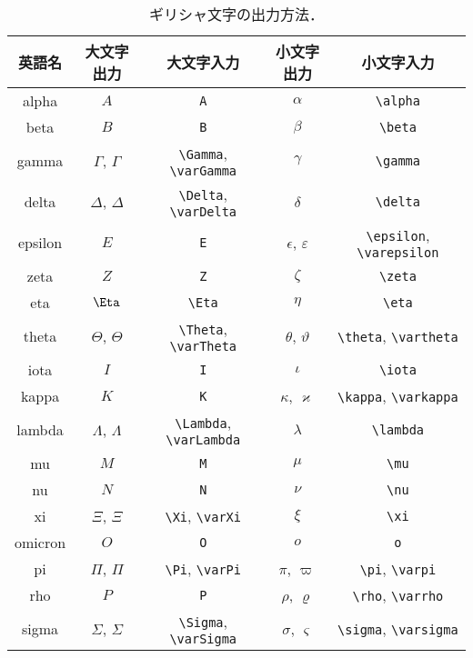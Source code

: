 \begin{table}[tp]
    \centering
    \caption{ギリシャ文字の出力方法．}
    \label{table:greek}
    \begin{tabular}{c|c|c|c|c} \hline\hline
        英語名 & 大文字出力 & 大文字入力 & 小文字出力 & 小文字入力 \\ \hline
        alpha & $A$ & \verb|A| & $\alpha$ & \verb|\alpha| \\ \hline
        beta & $B$ & \verb|B| & $\beta$ & \verb|\beta| \\ \hline
        gamma & $\Gamma$, $\varGamma$ & \verb|\Gamma|, \verb|\varGamma| & $\gamma$ & \verb|\gamma| \\ \hline
        delta & $\Delta$, $\varDelta$ & \verb|\Delta|, \verb|\varDelta| & $\delta$ & \verb|\delta| \\ \hline
        epsilon & $E$ & \verb|E| & $\epsilon$, $\varepsilon$ & \verb|\epsilon|, \verb|\varepsilon| \\ \hline
        zeta & $Z$ & \verb|Z| & $\zeta$ & \verb|\zeta| \\ \hline
        eta & $\Eta$ & \verb|\Eta| & $\eta$ & \verb|\eta| \\ \hline
        theta & $\Theta$, $\varTheta$ & \verb|\Theta|, \verb|\varTheta| & $\theta$, $\vartheta$ & \verb|\theta|, \verb|\vartheta| \\ \hline
        iota & $I$ & \verb|I| & $\iota$ & \verb|\iota| \\ \hline
        kappa & $K$ & \verb|K| & $\kappa$, $\varkappa$ & \verb|\kappa|, \verb|\varkappa| \\ \hline
        lambda & $\Lambda$, $\varLambda$ & \verb|\Lambda|, \verb|\varLambda| & $\lambda$ & \verb|\lambda| \\ \hline
        mu & $M$ & \verb|M| & $\mu$ & \verb|\mu| \\ \hline
        nu & $N$ & \verb|N| & $\nu$ & \verb|\nu| \\ \hline
        xi & $\Xi$, $\varXi$ & \verb|\Xi|, \verb|\varXi| & $\xi$ & \verb|\xi| \\ \hline
        omicron & $O$ & \verb|O| & $o$ & \verb|o| \\ \hline
        pi & $\Pi$, $\varPi$ & \verb|\Pi|, \verb|\varPi| & $\pi$, $\varpi$ & \verb|\pi|, \verb|\varpi| \\ \hline
        rho & $P$ & \verb|P| & $\rho$, $\varrho$ & \verb|\rho|, \verb|\varrho| \\ \hline
        sigma & $\Sigma$, $\varSigma$ & \verb|\Sigma|, \verb|\varSigma| & $\sigma$, $\varsigma$ & \verb|\sigma|, \verb|\varsigma| \\ \hline

\end{tabular}
\end{table}
